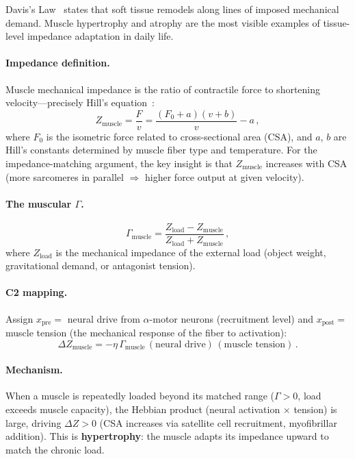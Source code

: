 \documentclass[aps,pre,twocolumn,superscriptaddress,floatfix]{revtex4-2}
\begin{document}
Davis's Law~\cite{Davis1867} states that soft tissue
remodels along lines of imposed mechanical demand.
Muscle hypertrophy and atrophy are the most visible
examples of tissue-level impedance adaptation in
daily life.

\paragraph{Impedance definition.}
Muscle mechanical impedance is the ratio of contractile
force to shortening velocity---precisely Hill's
equation~\cite{Hill1938}:
\begin{equation}
  Z_{\text{muscle}} = \frac{F}{v}
  = \frac{(F_0 + a)(v + b)}{v} - a\,,
  \label{eq:hill}
\end{equation}
where $F_0$ is the isometric force related to
cross-sectional area (CSA), and $a$, $b$ are
Hill's constants determined by muscle fiber type
and temperature.  For the impedance-matching argument,
the key insight is that $Z_{\text{muscle}}$ increases
with CSA (more sarcomeres in parallel $\Rightarrow$
higher force output at given velocity).

\paragraph{The muscular $\Gamma$.}
\begin{equation}
  \Gamma_{\text{muscle}} =
  \frac{Z_{\text{load}} - Z_{\text{muscle}}}
       {Z_{\text{load}} + Z_{\text{muscle}}}\,,
  \label{eq:gamma-muscle}
\end{equation}
where $Z_{\text{load}}$ is the mechanical impedance
of the external load (object weight, gravitational
demand, or antagonist tension).

\paragraph{C2 mapping.}
Assign $x_{\text{pre}} = $ neural drive from
$\alpha$-motor neurons (recruitment level) and
$x_{\text{post}} = $ muscle tension (the mechanical
response of the fiber to activation):
\begin{equation}
  \Delta Z_{\text{muscle}} =
  -\eta\,\Gamma_{\text{muscle}}\,
  (\text{neural drive})\,(\text{muscle tension})\,.
  \label{eq:c2-muscle}
\end{equation}

\paragraph{Mechanism.}
When a muscle is repeatedly loaded beyond its matched
range ($\Gamma > 0$, load exceeds muscle capacity),
the Hebbian product (neural activation $\times$
tension) is large, driving $\Delta Z > 0$
(CSA increases via satellite cell recruitment,
myofibrillar addition).
This is \textbf{hypertrophy}: the muscle adapts
its impedance upward to match the chronic load.
\end{document}
